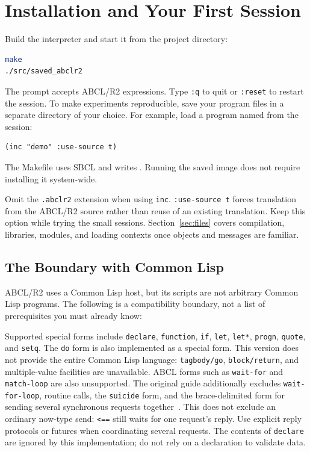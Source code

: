 \documentclass[11pt,a4paper]{article}
\newcommand{\code}[1]{\texttt{#1}}
\newcommand{\filepath}[1]{\path{#1}}
\begin{document}


\section{Installation and Your First Session}
\label{sec:first-session}

Build the interpreter and start it from the project directory:

\begin{lstlisting}[language=bash]
make
./src/saved_abclr2
\end{lstlisting}

The prompt accepts ABCL/R2 expressions. Type \code{:q} to quit or
\code{:reset} to restart the session. To make experiments reproducible,
save your program files in a separate directory of your choice.
For example, load a program named \filepath{demo.abclr2} from the session:

\begin{lstlisting}
(inc "demo" :use-source t)
\end{lstlisting}

The Makefile uses SBCL and writes \filepath{src/saved_abclr2}.
Running the saved image does not require installing it system-wide.

Omit the \code{.abclr2} extension when using \code{inc}.
\code{:use-source t} forces translation from the ABCL/R2 source rather
than reuse of an existing translation. Keep this option while trying
the small sessions. Section~\ref{sec:files} covers compilation, libraries,
modules, and loading contexts once objects and messages are familiar.



\subsection{The Boundary with Common Lisp}

ABCL/R2 uses a Common Lisp host, but its scripts are not arbitrary
Common Lisp programs. The following is a compatibility boundary, not a
list of prerequisites you must already know:

Supported special forms include \code{declare}, \code{function}, \code{if},
\code{let}, \code{let*}, \code{progn}, \code{quote}, and \code{setq}.
The \code{do} form is also implemented as a special form.
This version does not provide the entire Common Lisp language:
\code{tagbody/go}, \code{block/return}, and multiple-value facilities are
unavailable. ABCL forms such as \code{wait-for} and \code{match-loop}
are also unsupported.
The original guide additionally excludes \code{wait-for-loop},
routine calls, the \code{suicide} form, and the brace-delimited form
for sending several synchronous requests together~\cite{guide}.
This does not exclude an ordinary now-type send: \code{<==} still
waits for one request's reply. Use explicit reply protocols or futures
when coordinating several requests.
The contents of \code{declare} are ignored by this implementation;
do not rely on a declaration to validate data.
\end{document}
